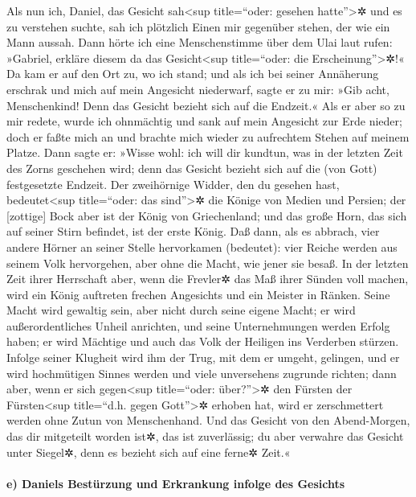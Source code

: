 Als nun ich, Daniel, das Gesicht sah\textless sup
title=``oder: gesehen hatte''\textgreater✲ und es zu verstehen suchte,
sah ich plötzlich Einen mir gegenüber stehen, der wie ein Mann aussah.
Dann hörte ich eine Menschenstimme über dem Ulai laut
rufen: »Gabriel, erkläre diesem da das Gesicht\textless sup
title=``oder: die Erscheinung''\textgreater✲!« Da kam er
auf den Ort zu, wo ich stand; und als ich bei seiner Annäherung erschrak
und mich auf mein Angesicht niederwarf, sagte er zu mir: »Gib acht,
Menschenkind! Denn das Gesicht bezieht sich auf die Endzeit.«
Als er aber so zu mir redete, wurde ich ohnmächtig und
sank auf mein Angesicht zur Erde nieder; doch er faßte mich an und
brachte mich wieder zu aufrechtem Stehen auf meinem Platze.
Dann sagte er: »Wisse wohl: ich will dir kundtun, was in
der letzten Zeit des Zorns geschehen wird; denn das Gesicht bezieht sich
auf die (von Gott) festgesetzte Endzeit. Der zweihörnige
Widder, den du gesehen hast, bedeutet\textless sup title=``oder: das
sind''\textgreater✲ die Könige von Medien und Persien;
der {[}zottige{]} Bock aber ist der König von
Griechenland; und das große Horn, das sich auf seiner Stirn befindet,
ist der erste König. Daß dann, als es abbrach, vier
andere Hörner an seiner Stelle hervorkamen (bedeutet): vier Reiche
werden aus seinem Volk hervorgehen, aber ohne die Macht, wie jener sie
besaß. In der letzten Zeit ihrer Herrschaft aber, wenn
die Frevler✲ das Maß ihrer Sünden voll machen, wird ein König auftreten
frechen Angesichts und ein Meister in Ränken. Seine Macht
wird gewaltig sein, aber nicht durch seine eigene Macht; er wird
außerordentliches Unheil anrichten, und seine Unternehmungen werden
Erfolg haben; er wird Mächtige und auch das Volk der Heiligen ins
Verderben stürzen. Infolge seiner Klugheit wird ihm der
Trug, mit dem er umgeht, gelingen, und er wird hochmütigen Sinnes werden
und viele unversehens zugrunde richten; dann aber, wenn er sich
gegen\textless sup title=``oder: über?''\textgreater✲ den Fürsten der
Fürsten\textless sup title=``d.h. gegen Gott''\textgreater✲ erhoben hat,
wird er zerschmettert werden ohne Zutun von Menschenhand.
Und das Gesicht von den Abend-Morgen, das dir mitgeteilt
worden ist✲, das ist zuverlässig; du aber verwahre das Gesicht unter
Siegel✲, denn es bezieht sich auf eine ferne✲ Zeit.«

\hypertarget{e-daniels-bestuxfcrzung-und-erkrankung-infolge-des-gesichts}{%
\paragraph{e) Daniels Bestürzung und Erkrankung infolge des
Gesichts}\label{e-daniels-bestuxfcrzung-und-erkrankung-infolge-des-gesichts}}

